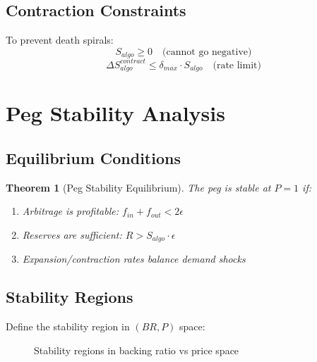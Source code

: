 \documentclass[11pt,a4paper]{article}
\newtheorem{theorem}{Theorem}
\begin{document}
\subsection{Contraction Constraints}

To prevent death spirals:
\begin{equation}
    S_{algo} \geq 0 \quad \text{(cannot go negative)}
\end{equation}
\begin{equation}
    \Delta S_{algo}^{contract} \leq \delta_{max} \cdot S_{algo} \quad \text{(rate limit)}
\end{equation}

\section{Peg Stability Analysis}

\subsection{Equilibrium Conditions}

\begin{theorem}[Peg Stability Equilibrium]
The peg is stable at $P = 1$ if:
\begin{enumerate}
    \item Arbitrage is profitable: $f_{in} + f_{out} < 2\epsilon$
    \item Reserves are sufficient: $R > S_{algo} \cdot \epsilon$
    \item Expansion/contraction rates balance demand shocks
\end{enumerate}
\end{theorem}

\subsection{Stability Regions}

Define the stability region in $(BR, P)$ space:

\begin{figure}[h]
\centering
{}
\caption{Stability regions in backing ratio vs price space}
\label{fig:stability_regions}
\end{figure}
\end{document}
